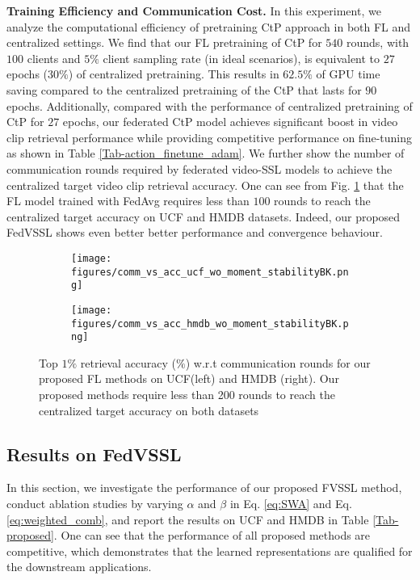 \noindent \textbf{Training  Efficiency and Communication Cost.} In this experiment, we analyze the computational efficiency of pretraining CtP approach in both FL and centralized settings. We find that our FL pretraining of CtP for $540$ rounds, with $100$ clients and $5\%$ client sampling rate (in ideal scenarios), is equivalent to $27$ epochs ($30\%$) of centralized pretraining. This results in $62.5\%$ of GPU time saving compared to the centralized pretraining of the CtP that lasts for $90$ epochs. Additionally, compared with the performance of centralized pretraining of CtP for $27$ epochs, our federated CtP model achieves significant boost in video clip retrieval performance while providing competitive performance on fine-tuning as shown in Table \ref{Tab-action_finetune_adam}. 
We further show the number of communication rounds required by federated video-SSL models to achieve the centralized target video clip retrieval accuracy. 
One can see from Fig. \ref{fig:comm_vs_no_rounds} that the FL model trained with FedAvg requires less than $100$ rounds to reach the centralized target accuracy on UCF and HMDB datasets. Indeed, our proposed FedVSSL shows even better better performance and convergence behaviour.


\begin{figure}[pt]
    \centering
\begin{subfigure}{0.5\textwidth}
    \centering
    \texttt{[image: figures/comm\_vs\_acc\_ucf\_wo\_moment\_stabilityBK.png]}\\
\end{subfigure}\begin{subfigure}{0.5\textwidth}
    \centering
    \texttt{[image: figures/comm\_vs\_acc\_hmdb\_wo\_moment\_stabilityBK.png]}
\end{subfigure}
    \caption{\small Top $1\%$ retrieval accuracy ($\%$) w.r.t communication rounds for our proposed FL methods on UCF(left) and HMDB (right).  Our proposed methods require less than 200 rounds to reach the centralized target accuracy on both datasets}
    \label{fig:comm_vs_no_rounds}
\end{figure}




\subsection{Results on FedVSSL}
\label{sec:propose}

In this section, we investigate the performance of our proposed FVSSL method, conduct ablation studies by varying $\alpha$ and $\beta$ in Eq. \ref{eq:SWA} and Eq. \ref{eq:weighted_comb}, and report the results on UCF and HMDB in Table \ref{Tab-proposed}. One can see that the performance of all proposed methods are competitive, which demonstrates that the learned representations are qualified for the downstream applications.


